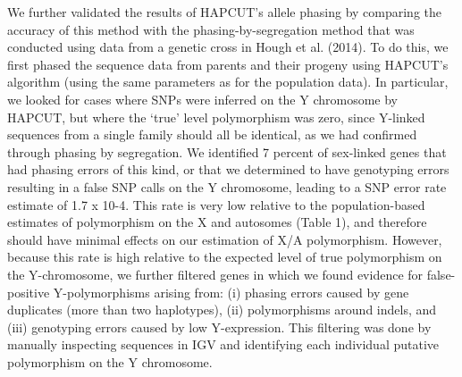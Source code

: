 \documentclass[9pt,twocolumn,twoside]{gsajnl}
\begin{document}
We further validated the results of HAPCUT’s allele phasing by comparing the accuracy of this method with the phasing-by-segregation method that was conducted using data from a genetic cross in Hough et al. (2014). To do this, we first phased the sequence data from parents and their progeny using HAPCUT’s algorithm (using the same parameters as for the population data). In particular, we looked for cases where SNPs were inferred on the Y chromosome by HAPCUT, but where the ‘true’ level polymorphism was zero, since Y-linked  sequences from a single family should all be identical, as we had confirmed through phasing by segregation. We identified 7 percent of sex-linked genes that had phasing errors of this kind, or that we determined to have genotyping errors resulting in a false SNP calls on the Y chromosome, leading to a SNP error rate estimate of 1.7 x 10-4. This rate is very low relative to the population-based estimates of polymorphism on the X and autosomes (Table 1), and therefore should have minimal effects on our estimation of X/A polymorphism. However, because this rate is high relative to the expected level of true polymorphism on the Y-chromosome, we further filtered genes in which we found evidence for false-positive Y-polymorphisms arising from: (i) phasing errors caused by gene duplicates (more than two haplotypes), (ii) polymorphisms around indels, and (iii) genotyping errors caused by low Y-expression. This filtering was done by manually inspecting sequences in IGV \citep{robinson2011integrative} and identifying each individual putative polymorphism on the Y chromosome.
\end{document}
